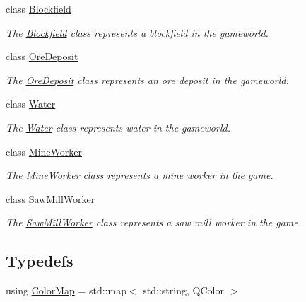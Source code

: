 \begin{DoxyCompactItemize}
class \hyperlink{classGame_1_1Blockfield}{Blockfield}
\begin{DoxyCompactList}\small\item\em The \hyperlink{classGame_1_1Blockfield}{Blockfield} class represents a blockfield in the gameworld. \end{DoxyCompactList}\item 
class \hyperlink{classGame_1_1OreDeposit}{Ore\-Deposit}
\begin{DoxyCompactList}\small\item\em The \hyperlink{classGame_1_1OreDeposit}{Ore\-Deposit} class represents an ore deposit in the gameworld. \end{DoxyCompactList}\item 
class \hyperlink{classGame_1_1Water}{Water}
\begin{DoxyCompactList}\small\item\em The \hyperlink{classGame_1_1Water}{Water} class represents water in the gameworld. \end{DoxyCompactList}\item 
class \hyperlink{classGame_1_1MineWorker}{Mine\-Worker}
\begin{DoxyCompactList}\small\item\em The \hyperlink{classGame_1_1MineWorker}{Mine\-Worker} class represents a mine worker in the game. \end{DoxyCompactList}\item 
class \hyperlink{classGame_1_1SawMillWorker}{Saw\-Mill\-Worker}
\begin{DoxyCompactList}\small\item\em The \hyperlink{classGame_1_1SawMillWorker}{Saw\-Mill\-Worker} class represents a saw mill worker in the game. \end{DoxyCompactList}\end{DoxyCompactItemize}
\subsection*{Typedefs}
\begin{DoxyCompactItemize}
\item 
using \hyperlink{namespaceGame_a1fe13161652a186ddb92a1774eeb6eaa}{Color\-Map} = std\-::map$<$ std\-::string, Q\-Color $>$
\end{DoxyCompactItemize}

